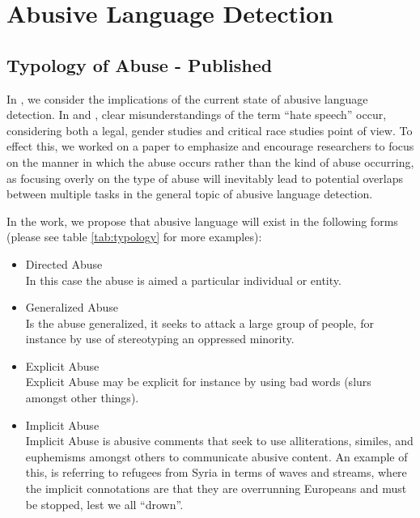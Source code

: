 \ifpdf
    \graphicspath{{Chapter4/Figs/Raster/}{Chapter4/Figs/PDF/}{Chapter4/Figs/}}
\else
    \graphicspath{{Chapter4/Figs/Vector/}{Chapter4/Figs/}}
\fi

\chapter{Abusive Language Detection}\label{chap:detection}

\section{Typology of Abuse - Published} 
In \cite{Waseem:2017}, we consider the implications of the current state of abusive language detection. In \cite{Davidson:2017} and \cite{Schmidt:2017}, clear misunderstandings of the term ``hate speech'' occur, considering both a legal, gender studies and critical race studies point of view. To effect this, we worked on a paper to emphasize  and encourage researchers to focus on the manner in which the abuse occurs rather than the kind of abuse occurring, as focusing overly on the type of abuse will inevitably lead to potential overlaps between multiple tasks in the general topic of abusive language detection.

In the work, we propose that abusive language will exist in the following forms (please see table \ref{tab:typology} for more examples):
\begin{itemize}
  \item{Directed Abuse\\In this case the abuse is aimed a particular individual or entity.}
  \item{Generalized Abuse\\Is the abuse generalized, it seeks to attack a large group of people, for instance by use of stereotyping an oppressed minority.}
  \item{Explicit Abuse\\Explicit Abuse may be explicit for instance by using bad words (slurs amongst other things).}
  \item{Implicit Abuse\\Implicit Abuse is abusive comments that seek to use alliterations, similes, and euphemisms amongst others to communicate abusive content. An example of this, is referring to refugees from Syria in terms of waves and streams, where the implicit connotations are that they are overrunning Europeans and must be stopped, lest we all ``drown''.}
\end{itemize}

